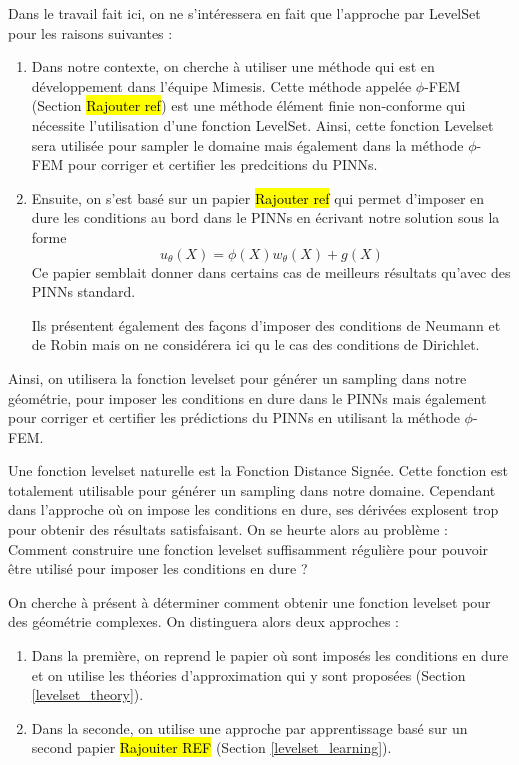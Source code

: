 Dans le travail fait ici, on ne s'intéressera en fait que l'approche par LevelSet pour les raisons suivantes :
\begin{enumerate}[label=\textbullet]
	\item Dans notre contexte, on cherche à utiliser une méthode qui est en développement dans l'équipe Mimesis. Cette méthode appelée $\phi$-FEM (Section \hl{Rajouter ref}) est une méthode élément finie  non-conforme qui nécessite l'utilisation d'une fonction LevelSet. Ainsi, cette fonction Levelset sera utilisée pour sampler le domaine mais également dans la méthode $\phi$-FEM pour corriger et certifier les predcitions du PINNs.
	\item Ensuite, on s'est basé sur un papier \hl{Rajouter ref} qui permet d'imposer en dure les conditions au bord dans le PINNs en écrivant notre solution sous la forme
	\begin{equation*}
		u_\theta(X)=\phi(X)w_\theta(X)+g(X)
	\end{equation*}
	Ce papier semblait donner dans certains cas de meilleurs résultats qu'avec des PINNs standard.
	\begin{Rem}
		Ils présentent également des façons d'imposer des conditions de Neumann et de Robin mais on ne considérera ici qu le cas des conditions de Dirichlet.
	\end{Rem}
\end{enumerate}
Ainsi, on utilisera la fonction levelset pour générer un sampling dans notre géométrie, pour imposer les conditions en dure dans le PINNs mais également pour corriger et certifier les prédictions du PINNs en utilisant la méthode $\phi$-FEM.

\begin{Rem}
	Une fonction levelset naturelle est la Fonction Distance Signée. Cette fonction est totalement utilisable pour générer un sampling dans notre domaine. Cependant dans l'approche où on impose les conditions en dure, ses dérivées explosent trop pour obtenir des résultats satisfaisant. On se heurte alors au problème : Comment construire une fonction levelset suffisamment régulière pour pouvoir être utilisé pour imposer les conditions en dure ?
\end{Rem}

On cherche à présent à déterminer comment obtenir une fonction levelset pour des géométrie complexes. On distinguera alors deux approches :
\begin{enumerate}[label=\textbullet]
	\item Dans la première, on reprend le papier où sont imposés les conditions en dure et on utilise les théories d'approximation qui y sont proposées (Section \ref{levelset_theory}).
	\item Dans la seconde, on utilise une approche par apprentissage basé sur un second papier \hl{Rajouiter REF} (Section \ref{levelset_learning}).
\end{enumerate}